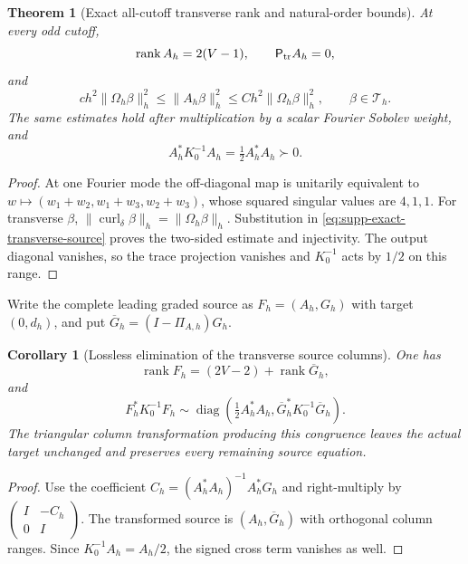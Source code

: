 \documentclass[11pt]{article}
\newtheorem{theorem}{Theorem}[section]
\newtheorem{corollary}[corollary]{Corollary}
\theoremstyle{definition}
\theoremstyle{remark}
\newcommand{\rank}{\operatorname{rank}}
\begin{document}
\begin{theorem}[Exact all-cutoff transverse rank and natural-order bounds]
\label{thm:supp-exact-transverse}
At every odd cutoff,
\begin{equation}
 \rank A_h=2(V-1),\qquad \mathsf P_{\rm tr}A_h=0,
 \label{eq:supp-exact-transverse-rank}
\end{equation}
and
\begin{equation}
 \boxed{c h^2\|\Omega_h\beta\|_h^2
 \le\|A_h\beta\|_h^2
 \le C h^2\|\Omega_h\beta\|_h^2,}
 \qquad \beta\in\mathcal T_h.
 \label{eq:supp-exact-transverse-bounds}
\end{equation}
The same estimates hold after multiplication by a scalar Fourier Sobolev
weight, and
\begin{equation}
 A_h^*K_0^{-1}A_h=\tfrac12A_h^*A_h\succ0.
 \label{eq:supp-exact-transverse-positive}
\end{equation}
\end{theorem}
\begin{proof}
At one Fourier mode the off-diagonal map is unitarily equivalent to
$w\mapsto(w_1+w_2,w_1+w_3,w_2+w_3)$, whose squared singular values are
$4,1,1$.  For transverse $\beta$,
$\|\operatorname{curl}_\delta\beta\|_h=\|\Omega_h\beta\|_h$.
Substitution in \eqref{eq:supp-exact-transverse-source} proves the two-sided
estimate and injectivity.  The output diagonal vanishes, so the trace
projection vanishes and $K_0^{-1}$ acts by $1/2$ on this range.
\end{proof}

Write the complete leading graded source as $F_h=(A_h,G_h)$ with target
$(0,d_h)$, and put $\overline G_h=(I-\Pi_{A,h})G_h$.

\begin{corollary}[Lossless elimination of the transverse source columns]
\label{cor:supp-exact-transverse-elimination}
One has
\begin{equation}
 \rank F_h=(2V-2)+\rank\overline G_h,
 \label{eq:supp-exact-rank-split}
\end{equation}
and
\begin{equation}
 F_h^*K_0^{-1}F_h\sim
 \operatorname{diag}\left(\tfrac12A_h^*A_h,
          \overline G_h^*K_0^{-1}\overline G_h\right).
 \label{eq:supp-exact-Gram-split}
\end{equation}
The triangular column transformation producing this congruence leaves the
actual target unchanged and preserves every remaining source equation.
\end{corollary}
\begin{proof}
Use the coefficient
$C_h=(A_h^*A_h)^{-1}A_h^*G_h$ and right-multiply by
$\left(\begin{smallmatrix}I&-C_h\\0&I\end{smallmatrix}\right)$.
The transformed source is $(A_h,\overline G_h)$ with orthogonal column
ranges.  Since $K_0^{-1}A_h=A_h/2$, the signed cross term vanishes as well.
\end{proof}
\end{document}
